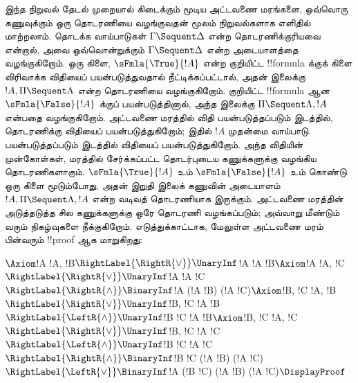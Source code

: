 \documentclass[../../../include/open-logic-section]{subfiles}
\begin{document}
இந்த நிறுவல் தேடல் முறையால் கிடைக்கும் மூடிய அட்டவணை
மரங்களை, ஒவ்வொரு கணுவுக்கும் ஒரு தொடரணியை வழங்குவதன்
மூலம்  நிறுவல்களாக எளிதில் மாற்றலாம். தொடக்க
வாய்பாடுகள் $\Gamma \Sequent \Delta$ என்ற தொடரணிக்குரியவை
என்றால், அவை ஒவ்வொன்றுக்கும் $\Gamma \Sequent \Delta$
என்ற அடையாளத்தை வழங்குகிறோம். ஒரு கிளை,
$\sFmla{\True}{!A}$ என்ற குறியிட்ட !!{formula} க்குக்
கிளை விரிவாக்க விதியைப் பயன்படுத்துவதால் நீட்டிக்கப்பட்டால்,
அதன் இலைக்கு $!A, \Pi \Sequent \Lambda$ என்ற தொடரணியை
வழங்குகிறோம். குறியிட்ட !!{formula} ஆன
$\sFmla{\False}{!A}$ க்குப் பயன்படுத்தினால்,
அந்த இலைக்கு $\Pi \Sequent \Lambda, !A$ என்பதை
வழங்குகிறோம். அட்டவணை மரத்தில்
\TRule{\True}{\star} விதி பயன்படுத்தப்படும் இடத்தில்,
தொடரணிக்கு \LeftR{\star} விதியைப் பயன்படுத்துகிறோம்;
இதில் $!A$ முதன்மை வாய்பாடு. \TRule{\False}{\star}
பயன்படுத்தப்படும் இடத்தில் \RightR{\star} விதியைப்
பயன்படுத்துகிறோம். அந்த விதியின் முன்கோள்கள், மரத்தில்
சேர்க்கப்பட்ட தொடர்புடைய கணுக்களுக்கு வழங்கிய
தொடரணிகளாகும். $\sFmla{\True}{!A}$ உம்
$\sFmla{\False}{!A}$ உம் கொண்டு ஒரு கிளை மூடும்போது,
அதன் இறுதி இலைக் கணுவின் அடையாளம்
$!A, \Pi \Sequent \Lambda, !A$ என்ற வடிவத் தொடரணியாக
இருக்கும். அட்டவணை மரத்தின் அடுத்தடுத்த சில கணுக்களுக்கு
ஒரே தொடரணி வழங்கப்படும்; அவ்வாறு மீண்டும் வரும்
நிகழ்வுகளை நீக்குகிறோம். எடுத்துக்காட்டாக, மேலுள்ள
அட்டவணை மரம் பின்வரும் !!{proof} ஆக மாறுகிறது:

\begin{maxwidth}
$
\Axiom$!A \fCenter !A, !B$
\RightLabel{\RightR{\lor}}
\UnaryInf$!A \fCenter !A \lor !B$
\Axiom$!A \fCenter !A, !C$
\RightLabel{\RightR{\lor}}
\UnaryInf$!A \fCenter !A \lor !C$
\RightLabel{\RightR{\land}}
\BinaryInf$!A \fCenter (!A \lor !B) \land (!A \lor !C)$
\Axiom$!B, !C \fCenter !A, !B$
\RightLabel{\RightR{\lor}}
\UnaryInf$!B, !C \fCenter !A \lor !B$
\RightLabel{\LeftR{\land}}
\UnaryInf$!B \land !C \fCenter !A \lor !B$
\Axiom$!B, !C \fCenter !A, !C$
\RightLabel{\RightR{\lor}}
\UnaryInf$!B, !C \fCenter !A \lor !C$
\RightLabel{\LeftR{\land}}
\UnaryInf$!B \land !C \fCenter !A \lor !C$
\RightLabel{\RightR{\land}}
\BinaryInf$!B \land !C \fCenter (!A \lor !B) \land
(!A \lor !C)$
\RightLabel{\LeftR{\lor}}
\BinaryInf$!A \lor (!B \land !C) \fCenter (!A \lor !B) \land
(!A \lor !C)$
\DisplayProof$
\end{maxwidth}
\end{document}
